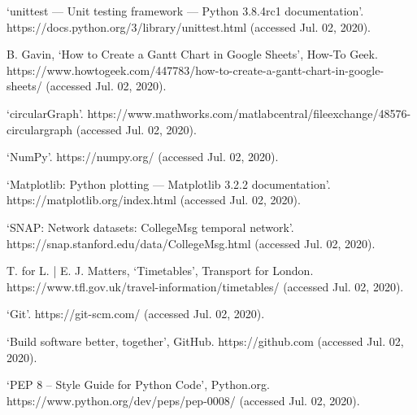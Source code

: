 \begin{thebibliography}{30}
‘unittest — Unit testing framework — Python 3.8.4rc1 documentation’. https://docs.python.org/3/library/unittest.html (accessed Jul. 02, 2020).

B. Gavin, ‘How to Create a Gantt Chart in Google Sheets’, How-To Geek. https://www.howtogeek.com/447783/how-to-create-a-gantt-chart-in-google-sheets/ (accessed Jul. 02, 2020).

‘circularGraph’. https://www.mathworks.com/matlabcentral/fileexchange/48576-circulargraph (accessed Jul. 02, 2020).

‘NumPy’. https://numpy.org/ (accessed Jul. 02, 2020).

‘Matplotlib: Python plotting — Matplotlib 3.2.2 documentation’. https://matplotlib.org/index.html (accessed Jul. 02, 2020).

‘SNAP: Network datasets: CollegeMsg temporal network’. https://snap.stanford.edu/data/CollegeMsg.html (accessed Jul. 02, 2020).

T. for L. | E. J. Matters, ‘Timetables’, Transport for London. https://www.tfl.gov.uk/travel-information/timetables/ (accessed Jul. 02, 2020).

‘Git’. https://git-scm.com/ (accessed Jul. 02, 2020).

‘Build software better, together’, GitHub. https://github.com (accessed Jul. 02, 2020).

‘PEP 8 -- Style Guide for Python Code’, Python.org. https://www.python.org/dev/peps/pep-0008/ (accessed Jul. 02, 2020).

\end{thebibliography}
\vspace{1cm}